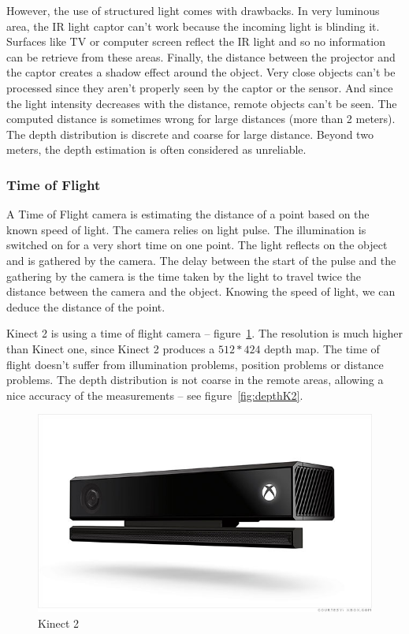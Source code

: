 \documentclass[12pt]{article}
\begin{document}
However, the use of structured light comes with drawbacks. In very luminous area, the IR light captor can't work because the incoming light is blinding it. Surfaces like TV or computer screen reflect the IR light and so no information can be retrieve from these areas. Finally, the distance between the projector and the captor creates a shadow effect around the object. Very close objects can't be processed since they aren't properly seen by the captor or the sensor. And since the light intensity decreases with the distance, remote objects can't be seen. The computed distance is sometimes wrong for large distances (more than 2 meters). The depth distribution is discrete and coarse for large distance. Beyond two meters, the depth estimation is often considered as unreliable.

\subsubsection{Time of Flight}
A Time of Flight camera is estimating the distance of a point based on the known speed of light. The camera relies on light pulse. The illumination is switched on for a very short time on one point. The light reflects on the object and is gathered by the camera. The delay between the start of the pulse and the gathering by the camera is the time taken by the light to travel twice the distance between the camera and the object. Knowing the speed of light, we can deduce the distance of the point.

Kinect 2 is using a time of flight camera -- figure~\ref{fig:kinect2}. The resolution is much higher than Kinect one, since Kinect 2 produces a $512*424$ depth map. The time of flight doesn't suffer from illumination problems, position problems or distance problems. The depth distribution is not coarse in the remote areas, allowing a nice accuracy of the measurements -- see figure~\ref{fig:depthK2}.

\begin{figure}[h]
  \centering
  \includegraphics[scale=0.3]{kinect2.jpg}
  \caption{\label{fig:kinect2} Kinect 2}
\end{figure}
\end{document}
